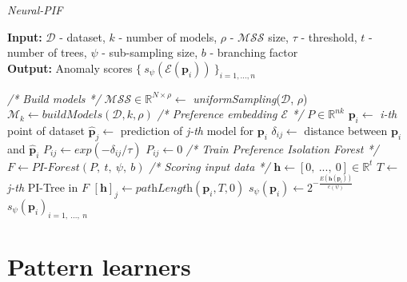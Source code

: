 \begin{algorithm}[h!]
    \caption{\textit{Neural-PIF}}
    \label{alg:npif}
    \textbf{Input:} $\mathcal{D}$ - dataset, $k$ - number of models, $\rho$ - $\mathcal{MSS}$ size, $\tau$ - threshold,  $t$ - number of trees, $\psi$ - sub-sampling size, $b$ - branching factor \\
    \textbf{Output:} Anomaly scores $\{\ s_\psi(\mathcal{E}(\textbf{p}_i))\ \}_{i=1, ..., n}$
    \begin{algorithmic}[1]
        \State\textit{/* Build models */}
        \State $\mathcal{MSS} \in \mathbb{R}^{N \times \rho} \gets$ \textit{uniformSampling}($\mathcal{D}$, $\rho$)
        \State $\mathcal{M}_k \gets buildModels(\mathcal{D}, k, \rho)$
        \State
        \State \textit{/* Preference embedding $\mathcal{E}$ */}
        \State $P \in \mathbb{R}^{nk}$ 
            \State $\textbf{p}_i \gets $ \textit{i-th} point of dataset
                \State $\hat{\textbf{p}}_j \gets$ prediction of \textit{j-th} model for $\textbf{p}_i$
                \State $\delta_{ij} \gets$ distance between $\textbf{p}_i$ and $\hat{\textbf{p}}_i$
                    \State $P_{ij} \gets exp(-\delta_{ij} / \tau)$
                \Else
                    \State $P_{ij} \gets 0$
                \EndIf
            \EndFor
        \EndFor
        \State
        \State \textit{/* Train Preference Isolation Forest */}
        \State $F \gets \textit{PI-Forest}(P,\ t,\ \psi,\ b)$
        \State
        \State \textit{/* Scoring input data */}
            \State $\textbf{h} \gets [0,\ ...,\ 0] \in \mathbb{R}^t$
                \State $T \gets $ \textit{j-th} PI-Tree in $F$
                \State $[\textbf{h}]_j \gets \textit{pathLength}(\textbf{p}_i, T, 0)$
            \EndFor
            \State $s_\psi(\textbf{p}_i) \gets 2^{- \frac{E(\textbf{h}(\textbf{p}_i))}{c(\psi)}}$
        \EndFor
        \State \Return $s_\psi(\textbf{p}_i)_{i=1,\ ...,\ n}$
    \end{algorithmic}
\end{algorithm}

\section{Pattern learners}

